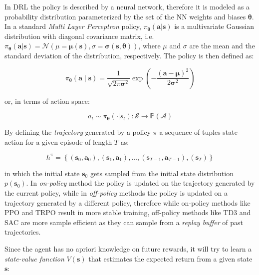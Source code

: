 In \ac{DRL} the policy is described by a neural network, therefore it is modeled as a probability distribution parameterized by the set of the \ac{NN} weights and biases $\boldsymbol{\theta}$. In a standard \textit{Multi Layer Perceptron} policy, $\pi _{\boldsymbol{\theta}}(\mathbf{a} | \mathbf{s})$ is a multivariate Gaussian distribution with diagonal covariance matrix, i.e. $\pi _{\boldsymbol{\theta}}(\mathbf{a} | \mathbf{s}) = \mathcal{N}(\mu = \boldsymbol{\mu}(\mathbf{s}), \sigma = \boldsymbol{\sigma}(\mathbf{s}, \boldsymbol{\theta}))$, where $\mu$ and $\sigma$ are the mean and the standard deviation of the distribution, respectively. The policy is then defined as:

\begin{equation}
    \pi _{\boldsymbol{\theta}}(\mathbf{a} \mid \mathbf{s}) = \frac{1}{\sqrt{2 \pi \boldsymbol{\sigma} ^2}} \exp \left(- \frac{(\mathbf{a} - \boldsymbol{\mu}) ^2}{2 \boldsymbol{\sigma} ^2} \right)
\end{equation}

or, in terms of action space:

\begin{equation}
    a _t \sim \pi _{\boldsymbol{\theta}}(\cdot | s_t): \mathcal{S} \rightarrow \mathbb{P}(\mathcal{A})
\end{equation}

By defining the \textit{trajectory} generated by a policy $\pi$ a sequence of tuples state-action for a given episode of length $T$ as:

\begin{equation}
    h ^{\pi} = \left\{ (\mathbf{s} _0, \mathbf{a} _0), (\mathbf{s} _1, \mathbf{a} _1), \dots, (\mathbf{s} _{T-1}, \mathbf{a} _{T-1}), (\mathbf{s} _T) \right\}
\end{equation}

in which the initial state $\mathbf{s} _0$ gets sampled from the initial state distribution $p(\mathbf{s} _0)$.
In \textit{on-policy} method the policy is updated on the trajectory generated by the current policy, while in \textit{off-policy} methods the policy is updated on a trajectory generated by a different policy, therefore while on-policy methods like \ac{PPO} and \ac{TRPO} result in more stable training, off-policy methods like \ac{TD3} and \ac{SAC} are more sample efficient as they can sample from a \textit{replay buffer} of past trajectories.

Since the agent has no apriori knowledge on future rewards, it will try to learn a \textit{state-value function} $V(\mathbf{s})$ that estimates the expected return from a given state $\mathbf{s}$:

